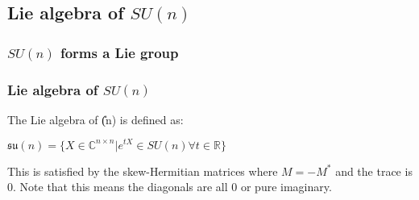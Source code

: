 \subsection{Lie algebra of \(SU(n)\)}

\subsubsection{\(SU(n)\) forms a Lie group}

\subsubsection{Lie algebra of \(SU(n)\)}

The Lie algebra of \U(n)\) is defined as:

\(\mathfrak{su}(n)=\{X\in \mathbb {C}^{n\times n}|e^{tX}\in SU(n) \forall t\in \mathbb{R}\}\)

This is satisfied by the skew-Hermitian matrices where \(M=-M^*\) and the trace is \(0\). Note that this means the diagonals are all \(0\) or pure imaginary.


